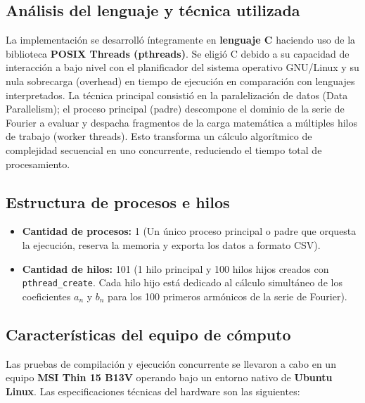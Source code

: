 \subsection*{Análisis del lenguaje y técnica utilizada}
La implementación se desarrolló íntegramente en \textbf{lenguaje C} haciendo uso de la biblioteca \textbf{POSIX Threads (pthreads)}. Se eligió C debido a su capacidad de interacción a bajo nivel con el planificador del sistema operativo GNU/Linux y su nula sobrecarga (overhead) en tiempo de ejecución en comparación con lenguajes interpretados. La técnica principal consistió en la paralelización de datos (Data Parallelism); el proceso principal (padre) descompone el dominio de la serie de Fourier a evaluar y despacha fragmentos de la carga matemática a múltiples hilos de trabajo (worker threads). Esto transforma un cálculo algorítmico de complejidad secuencial en uno concurrente, reduciendo el tiempo total de procesamiento.

\subsection*{Estructura de procesos e hilos}
\begin{itemize}
    \item \textbf{Cantidad de procesos:} 1 (Un único proceso principal o padre que orquesta la ejecución, reserva la memoria y exporta los datos a formato CSV).
    \item \textbf{Cantidad de hilos:} 101 (1 hilo principal y 100 hilos hijos creados con \texttt{pthread\_create}. Cada hilo hijo está dedicado al cálculo simultáneo de los coeficientes $a_n$ y $b_n$ para los 100 primeros armónicos de la serie de Fourier).
\end{itemize}

\subsection*{Características del equipo de cómputo}
Las pruebas de compilación y ejecución concurrente se llevaron a cabo en un equipo \textbf{MSI Thin 15 B13V} operando bajo un entorno nativo de \textbf{Ubuntu Linux}. Las especificaciones técnicas del hardware son las siguientes:

